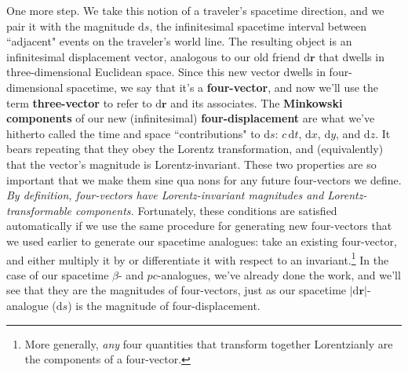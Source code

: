 \documentclass[12pt]{article}
\renewcommand{\vv}[1]{\mathbf{#1}}
\newcommand{\dd}[1]{\mathrm{d}#1}
\begin{document}
One more step. We take this notion of a traveler's spacetime direction, and we pair it with the magnitude $\dd s$, the infinitesimal spacetime interval between ``adjacent" events on the traveler's world line. The resulting object is an infinitesimal displacement vector, analogous to our old friend $\dd \vv r$ that dwells in three-dimensional Euclidean space. Since this new vector dwells in four-dimensional spacetime, we say that it's a \textbf{four-vector}, and now we'll use the term \textbf{three-vector} to refer to $\dd \vv r$ and its associates. The \textbf{Minkowski components} of our new (infinitesimal) \textbf{four-displacement} are what we've hitherto called the time and space ``contributions" to $\dd s$: $c \, \dd t$, $\dd x$, $\dd y$, and $\dd z$. It bears repeating that they obey the Lorentz transformation, and (equivalently) that the vector's magnitude is Lorentz-invariant. These two properties are so important that we make them sine qua nons for any future four-vectors we define. \emph{By definition, four-vectors have Lorentz-invariant magnitudes and Lorentz-transformable components.} Fortunately, these conditions are satisfied automatically if we use the same procedure for generating new four-vectors that we used earlier to generate our spacetime analogues: take an existing four-vector, and either multiply it by or differentiate it with respect to an invariant.\footnote{More generally, \emph{any} four quantities that transform together Lorentzianly are the components of a four-vector.} In the case of our spacetime $\beta$- and $p c$-analogues, we've already done the work, and we'll see that they are the magnitudes of four-vectors, just as our spacetime $\vert \dd \vv r \vert$-analogue ($\dd s$) is the magnitude of four-displacement.
\end{document}
